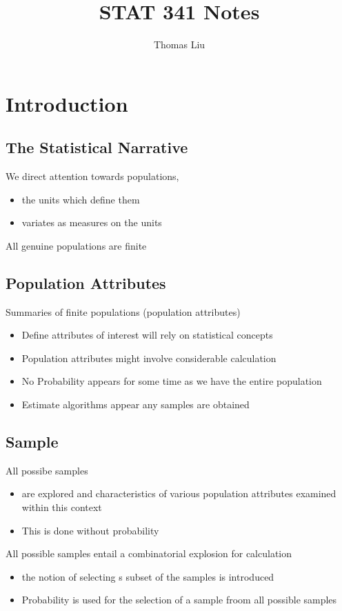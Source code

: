 \documentclass[11pt]{article}
\title{STAT 341 Notes}
\author{Thomas Liu}
\begin{document}
\maketitle
\tableofcontents

\newpage 
\section{Introduction}
\subsection{The Statistical Narrative}
We direct attention towards populations,
\begin{itemize}
    \item the units which define them 
    \item variates as measures on the units 
\end{itemize}
All genuine populations are finite
\subsection{Population Attributes}
Summaries of finite populations (population attributes)
\begin{itemize}
    \item Define attributes of interest will rely on statistical concepts
    \item Population attributes might involve considerable calculation
    \item No Probability appears for some time as we have the entire population 
    \item Estimate algorithms appear any samples are obtained
\end{itemize}
\subsection{Sample}
All possibe samples 
\begin{itemize}
    \item are explored and characteristics of various population attributes examined within this context
    \item This is done without probability 
\end{itemize}
All possible samples entail a combinatorial explosion for calculation 
\begin{itemize}
    \item the notion of selecting s subset of the samples is introduced
    \item Probability is used for the selection of a sample froom all possible samples 
\end{itemize}
\end{document}
